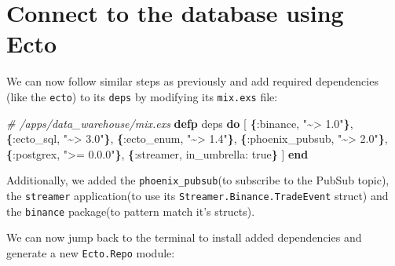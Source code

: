 \documentclass[
  oneside]{book}
\newenvironment{Shaded}{\begin{snugshade}}{\end{snugshade}}
\newcommand{\AttributeTok}[1]{\textcolor[rgb]{0.13,0.29,0.53}{#1}}
\newcommand{\CommentTok}[1]{\textcolor[rgb]{0.56,0.35,0.01}{\textit{#1}}}
\newcommand{\ConstantTok}[1]{\textcolor[rgb]{0.56,0.35,0.01}{#1}}
\newcommand{\ExtensionTok}[1]{#1}
\newcommand{\FunctionTok}[1]{\textcolor[rgb]{0.13,0.29,0.53}{\textbf{#1}}}
\newcommand{\KeywordTok}[1]{\textcolor[rgb]{0.13,0.29,0.53}{\textbf{#1}}}
\newcommand{\NormalTok}[1]{#1}
\newcommand{\OtherTok}[1]{\textcolor[rgb]{0.56,0.35,0.01}{#1}}
\newcommand{\StringTok}[1]{\textcolor[rgb]{0.31,0.60,0.02}{#1}}
\newcommand{\VariableTok}[1]{\textcolor[rgb]{0.00,0.00,0.00}{#1}}
\begin{document}
\section{Connect to the database using Ecto}\label{connect-to-the-database-using-ecto}

We can now follow similar steps as previously and add required dependencies (like the \texttt{ecto}) to its \texttt{deps} by modifying its \texttt{mix.exs} file:

\begin{Shaded}
\begin{Highlighting}[]
  \CommentTok{\# /apps/data\_warehouse/mix.exs}
  \KeywordTok{defp}\NormalTok{ deps }\KeywordTok{do}
    \OtherTok{[}
      \FunctionTok{\{}\VariableTok{:binance}\NormalTok{, }\StringTok{"\textasciitilde{}\textgreater{} 1.0"}\FunctionTok{\}}\NormalTok{,}
      \FunctionTok{\{}\VariableTok{:ecto\_sql}\NormalTok{, }\StringTok{"\textasciitilde{}\textgreater{} 3.0"}\FunctionTok{\}}\NormalTok{,}
      \FunctionTok{\{}\VariableTok{:ecto\_enum}\NormalTok{, }\StringTok{"\textasciitilde{}\textgreater{} 1.4"}\FunctionTok{\}}\NormalTok{,}
      \FunctionTok{\{}\VariableTok{:phoenix\_pubsub}\NormalTok{, }\StringTok{"\textasciitilde{}\textgreater{} 2.0"}\FunctionTok{\}}\NormalTok{,}
      \FunctionTok{\{}\VariableTok{:postgrex}\NormalTok{, }\StringTok{"\textgreater{}= 0.0.0"}\FunctionTok{\}}\NormalTok{,}
      \FunctionTok{\{}\VariableTok{:streamer}\NormalTok{, }\VariableTok{in\_umbrella:} \ConstantTok{true}\FunctionTok{\}}
    \OtherTok{]}
  \KeywordTok{end}
\end{Highlighting}
\end{Shaded}

Additionally, we added the \texttt{phoenix\_pubsub}(to subscribe to the PubSub topic), the \texttt{streamer} application(to use its \texttt{Streamer.Binance.TradeEvent} struct) and the \texttt{binance} package(to pattern match it's structs).

We can now jump back to the terminal to install added dependencies and generate a new \texttt{Ecto.Repo} module:

\begin{Shaded}
\end{Shaded}
\end{document}
